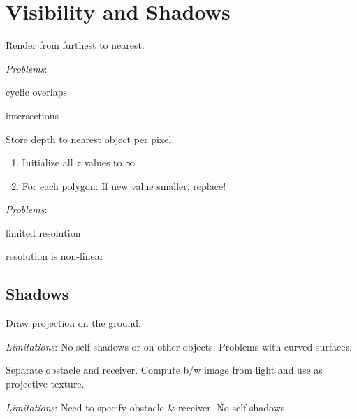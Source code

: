 \section{Visibility and Shadows}

\begin{algorithm}
  Render from furthest to nearest.

  \textit{Problems}:
  \begin{itemize*}
    \item cyclic overlaps
    \item intersections
  \end{itemize*}
\end{algorithm}

\begin{algorithm}[Z-Buffering]
  Store depth to nearest object per pixel.

  \begin{enumerate}
    \item Initialize all \(z\) values to \(\infty\)
    \item For each polygon: If new value smaller, replace!
  \end{enumerate}

  \textit{Problems}:
  \begin{itemize*}
    \item limited resolution
    \item resolution is non-linear
  \end{itemize*}
\end{algorithm}

\subsection{Shadows}

\begin{definition}
  Draw projection on the ground.

  \textit{Limitations}:
  No self shadows or on other objects.
  Problems with curved surfaces.
\end{definition}

\begin{definition}
  Separate obstacle and receiver. Compute b/w image from light and use as projective texture.

  \textit{Limitations}:
  Need to specify obstacle \& receiver.
  No self-shadows.
\end{definition}

